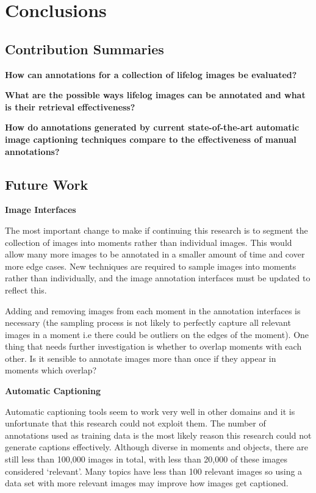 \chapter{Conclusions}

\section{Contribution Summaries}

\textbf{How can annotations for a collection of lifelog images be evaluated?}

\textbf{What are the possible ways lifelog images can be annotated and what is their retrieval effectiveness?
}

\textbf{How do annotations generated by current state-of-the-art automatic image captioning techniques compare to the effectiveness of manual annotations?}


\section{Future Work}

\textbf{Image Interfaces}

The most important change to make if continuing this research is to segment the collection of images into moments rather than individual images. This would allow many more images to be annotated in a smaller amount of time and cover more edge cases. New techniques are required to sample images into moments rather than individually, and the image annotation interfaces must be updated to reflect this. 

Adding and removing images from each moment in the annotation interfaces is necessary (the sampling process is not likely to perfectly capture all relevant images in a moment i.e there could be outliers on the edges of the moment). One thing that needs further investigation is whether to overlap moments with each other. Is it sensible to annotate images more than once if they appear in moments which overlap?

\textbf{Automatic Captioning}

Automatic captioning tools seem to work very well in other domains and it is unfortunate that this research could not exploit them. The number of annotations used as training data is the most likely reason this research could not generate captions effectively. Although diverse in moments and objects, there are still less than 100,000 images in total, with less than 20,000 of these images considered `relevant'. Many topics have less than 100 relevant images so using a data set with more relevant images may improve how images get captioned. 

